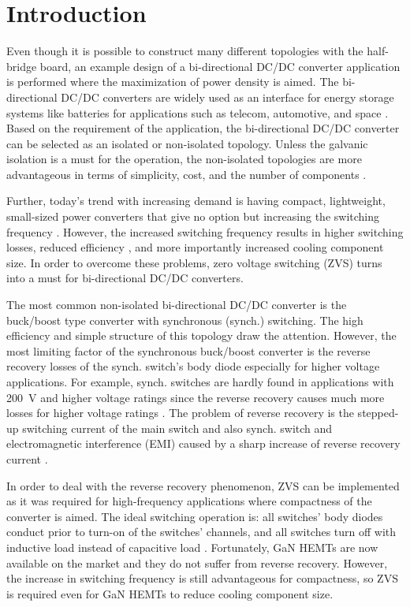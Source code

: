 \documentclass[energies,article,submit,moreauthors,pdftex]{Definitions/mdpi}
\begin{document}

\section{Introduction}

Even though it is possible to construct many different topologies with the half-bridge board, an example design of a bi-directional DC/DC converter application is performed where the maximization of power density is aimed. The bi-directional DC/DC converters are widely used as an interface for energy storage systems like batteries for applications such as telecom, automotive, and space \cite{Das2010, Huang2016b}. Based on the requirement of the application, the bi-directional DC/DC converter can be selected as an isolated or non-isolated topology. Unless the galvanic isolation is a must for the operation, the non-isolated topologies are more advantageous in terms of simplicity, cost, and the number of components \cite{Das2010, Yang2014}.

Further, today's trend with increasing demand is having compact, lightweight, small-sized power converters that give no option but increasing the switching frequency \cite{Konjedic2016}. However, the increased switching frequency results in higher switching losses, reduced efficiency \cite{Konjedic2016}, and more importantly increased cooling component size. In order to overcome these problems, zero voltage switching (ZVS) turns into a must for bi-directional DC/DC converters.

The most common non-isolated bi-directional DC/DC converter is the buck/boost type converter with synchronous (synch.) switching. The high efficiency and simple structure of this topology \cite{Pavlovsky2014} draw the attention. However, the most limiting factor of the synchronous buck/boost converter is the reverse recovery losses of the synch. switch's body diode especially for higher voltage applications. For example, synch. switches are hardly found in applications with 200~V and higher voltage ratings since the reverse recovery causes much more losses for higher voltage ratings \cite{Mao2008}. The problem of reverse recovery is the stepped-up switching current of the main switch and also synch. switch and electromagnetic interference (EMI) caused by a sharp increase of reverse recovery current \cite{Konjedic2016,Mao2008, Chen2016}.

In order to deal with the reverse recovery phenomenon, ZVS can be implemented as it was required for high-frequency applications where compactness of the converter is aimed. The ideal switching operation is: all switches’ body diodes conduct prior to turn-on of the switches' channels, and all switches turn off with inductive load instead of capacitive load \cite{Mao2008}. Fortunately, GaN HEMTs are now available on the market and they do not suffer from reverse recovery. However, the increase in switching frequency is still advantageous for compactness, so ZVS is required even for GaN HEMTs to reduce cooling component size.
\end{document}
